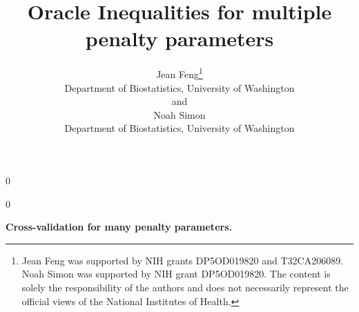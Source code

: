 \documentclass[12pt]{article}
\newcommand{\blind}{0}
\begin{document}
%

\def\spacingset#1{\renewcommand{\baselinestretch}%
{#1}\small\normalsize} \spacingset{1}



\blind
{
  \title{\bf Oracle Inequalities for multiple penalty parameters}
  \author{Jean Feng\thanks{
    Jean Feng was supported by NIH grants DP5OD019820 and T32CA206089.
    Noah Simon was supported by NIH grant DP5OD019820.
    The content is solely the responsibility of the authors and does not necessarily represent the official views of the National Institutes of Health.}\\
    Department of Biostatistics, University of Washington\\
    and \\
    Noah Simon \\
    Department of Biostatistics, University of Washington}
  \maketitle
} \fi

\blind
{
  \bigskip
  \bigskip
  \bigskip
  \begin{center}
    {\LARGE\bf Cross-validation for many penalty parameters.}
\end{center}
  \medskip
} \fi
\end{document}
